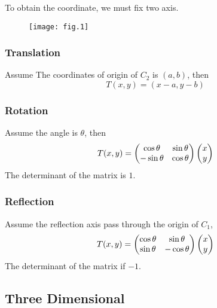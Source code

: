 \documentclass{article}
\begin{document}
To obtain the coordinate, we must fix two axis.
\begin{figure}
\texttt{[image: fig.1]}
\end{figure}

\subsubsection{Translation}
Assume The coordinates of origin of $C_2$ is $(a, b)$, then 
\begin{equation*}
T(x, y) = (x - a, y - b)
\end{equation*}

\subsubsection{Rotation}
Assume the angle is $\theta$, then
\begin{equation*}
T(x, y) =
\left(\begin{matrix}
\cos \theta & \sin \theta \cr
-\sin \theta & \cos \theta
\end{matrix}\right)
\left(\begin{matrix}
x \cr y
\end{matrix}\right)
\end{equation*}
The determinant of the matrix is $1$.

\subsubsection{Reflection}
Assume the reflection axis pass through the origin of $C_1$, 
\begin{equation*}
T(x, y) =
\left(\begin{matrix}
\cos \theta & \sin \theta \cr
\sin \theta & -\cos \theta
\end{matrix}\right)
\left(\begin{matrix}
x \cr y
\end{matrix}\right)
\end{equation*}
The determinant of the matrix if $-1$.



\subsection{Three Dimensional}
\end{document}

